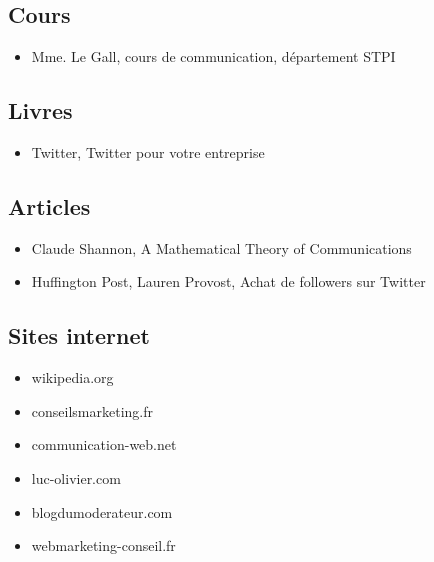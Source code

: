 \subsection{Cours}
\begin{itemize}
	\item Mme. Le Gall, cours de communication, département STPI
\end{itemize}
\subsection{Livres}
\begin{itemize}
	\item Twitter, Twitter pour votre entreprise
\end{itemize}
\subsection{Articles}
\begin{itemize}
	\item Claude Shannon, A Mathematical Theory of Communications
	\item Huffington Post, Lauren Provost, Achat de followers sur Twitter
\end{itemize}
\subsection{Sites internet}
\begin{itemize}
\item wikipedia.org
\item conseilsmarketing.fr
\item communication-web.net
\item luc-olivier.com
\item blogdumoderateur.com
\item webmarketing-conseil.fr
\end{itemize}

